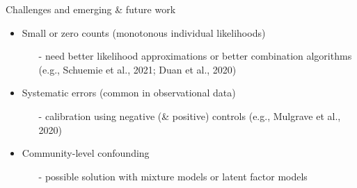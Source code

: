 \documentclass[aspectratio=169,xcolor=dvipsnames]{beamer}					%
\begin{document}
{
\begin{frame}{Challenges and emerging \& future work}
\begin{itemize}
    \item Small or zero counts (monotonous individual likelihoods)
    \begin{itemize}
        \item[-] need better likelihood approximations or better combination algorithms (e.g., Schuemie et al., 2021; Duan et al., 2020)
    \end{itemize}
    \item Systematic errors (common in observational data)
    \begin{itemize}
        \item[-] calibration using negative (\& positive) controls (e.g., Mulgrave et al., 2020) 
    \end{itemize}
    \item Community-level confounding
    \begin{itemize}
        \item[-] possible solution with mixture models or latent factor models 
    \end{itemize}
\end{itemize}

\end{frame}
}
\end{document}
